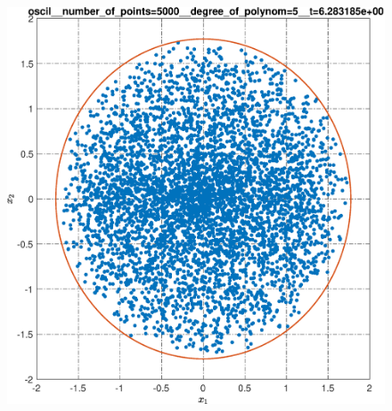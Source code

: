 \documentclass[../main.tex]{subfiles}
\begin{document}
\begin{figure}[ht!]
\begin{minipage}[b]{.3\linewidth}
  	\end{minipage} 
  	\vfill
  	\hspace{-2.5ex}
  	\begin{minipage}[b]{.3\linewidth} 
  		\small
  		\centering 
  		\includegraphics[width=\linewidth]{images/oscil__number_of_points=5000__degree_of_polynom=5__t=2pi.eps}
  		\label{fig:ap:oscilN5103k5T2pi}
  	\end{minipage}
  	\hfill
  	\begin{minipage}[b]{.3\linewidth} 
  		\small
  		\centering

\end{minipage}
\end{figure}
\end{document}
